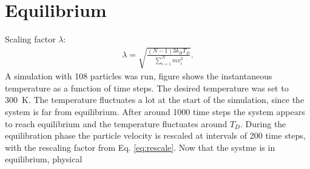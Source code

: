 \section{Equilibrium}
Scaling factor $\lambda$:
\begin{gather}\label{eq:rescale}
    \lambda=\sqrt{\frac{(N-1)3k_BT_D}{\sum_{i=1}^{N} mv_i^{2}}}.
\end{gather}
A simulation with 108 particles was run, figure %
shows the instantaneous temperature as a function of time steps. The desired temperature was set to 300~K. The temperature fluctuates a lot at the start of the simulation, since the system is far from equilibrium. After around 1000 time steps the system appears to reach equilibrium and the temperature fluctuates around $T_D$. During the equilibration phase the particle velocity is rescaled at intervals of 200 time steps, with the rescaling factor from Eq. \ref{eq:rescale}. Now that the systme is in equilibrium, physical 